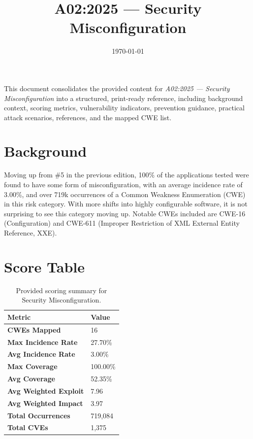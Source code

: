 \documentclass[11pt]{article}
\title{\textbf{A02:2025 — Security Misconfiguration}}
\date{\today}
\begin{document}
\maketitle

\begin{infobox}
This document consolidates the provided content for \textit{A02:2025 — Security Misconfiguration} into a structured, print-ready reference, including background context, scoring metrics, vulnerability indicators, prevention guidance, practical attack scenarios, references, and the mapped CWE list.
\end{infobox}

\tableofcontents
\newpage

\section{Background}
Moving up from \#5 in the previous edition, 100\% of the applications tested were found to have some form of misconfiguration, with an average incidence rate of 3.00\%, and over 719k occurrences of a Common Weakness Enumeration (CWE) in this risk category. With more shifts into highly configurable software, it is not surprising to see this category moving up. Notable CWEs included are CWE-16 (Configuration) and CWE-611 (Improper Restriction of XML External Entity Reference, XXE).

\section{Score Table}
\begin{table}[h!]
\centering
\renewcommand{\arraystretch}{1.2}
\begin{tabular}{@{}>{\bfseries}p{4.6cm}p{3.4cm}@{}}
\toprule
Metric & Value \\
\midrule
CWEs Mapped & 16 \\
Max Incidence Rate & 27.70\% \\
Avg Incidence Rate & 3.00\% \\
Max Coverage & 100.00\% \\
Avg Coverage & 52.35\% \\
Avg Weighted Exploit & 7.96 \\
Avg Weighted Impact & 3.97 \\
Total Occurrences & 719,084 \\
Total CVEs & 1,375 \\
\bottomrule
\end{tabular}
\caption{Provided scoring summary for Security Misconfiguration.}
\end{table}
\end{document}
